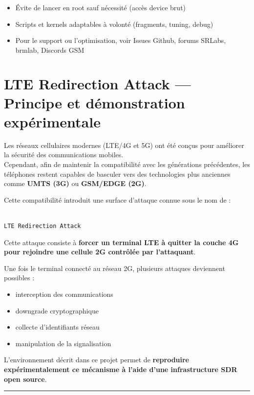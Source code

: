 \documentclass[
  french,
]{article}
\providecommand{\tightlist}{%
  \setlength{\itemsep}{0pt}\setlength{\parskip}{0pt}}
\begin{document}
\begin{itemize}
\tightlist
\item
  Évite de lancer en root sauf nécessité (accès device brut)
\item
  Scripts et kernels adaptables à volonté (fragments, tuning, debug)
\item
  Pour le support ou l'optimisation, voir Issues Github, forums SRLabs,
  brmlab, Discords GSM
\end{itemize}

\section{LTE Redirection Attack --- Principe et démonstration
expérimentale}\label{lte-redirection-attack-principe-et-duxe9monstration-expuxe9rimentale}

Les réseaux cellulaires modernes (LTE/4G et 5G) ont été conçus pour
améliorer la sécurité des communications mobiles.\\
Cependant, afin de maintenir la compatibilité avec les générations
précédentes, les téléphones restent capables de basculer vers des
technologies plus anciennes comme \textbf{UMTS (3G)} ou \textbf{GSM/EDGE
(2G)}.

Cette compatibilité introduit une surface d'attaque connue sous le nom
de :

\begin{verbatim}

LTE Redirection Attack
\end{verbatim}

Cette attaque consiste à \textbf{forcer un terminal LTE à quitter la
couche 4G pour rejoindre une cellule 2G contrôlée par l'attaquant}.

Une fois le terminal connecté au réseau 2G, plusieurs attaques
deviennent possibles :

\begin{itemize}
\tightlist
\item
  interception des communications
\item
  downgrade cryptographique
\item
  collecte d'identifiants réseau
\item
  manipulation de la signalisation
\end{itemize}

L'environnement décrit dans ce projet permet de \textbf{reproduire
expérimentalement ce mécanisme à l'aide d'une infrastructure SDR open
source}.

\begin{center}\rule{0.5\linewidth}{0.5pt}\end{center}
\end{document}
